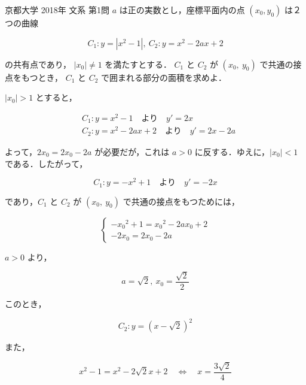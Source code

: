 \documentclass[a4paper]{ltjsarticle}
\begin{document}
\begin{itembox}[l]{京都大学 2018年 文系 第1問}
    $a$ は正の実数とし，座標平面内の点 $(x_0, y_0)$ は２つの曲線

    \begin{equation*}
        C_1\colon y=|x^2-1|,\ C_2\colon y=x^2-2ax+2
    \end{equation*}

    の共有点であり， $|x_0|\neq 1$ を満たすとする． $C_1$ と $C_2$ が $(x_0,\ y_0)$ で共通の接点をもつとき， $C_1$ と $C_2$ で囲まれる部分の面積を求めよ．
\end{itembox}

$|x_0|>1$ とすると，

\begin{align*}
     & C_1\colon y=x^2-1\quad\text{より}\quad y'=2x        \\
     & C_2\colon y=x^2-2ax+2\quad\text{より}\quad y'=2x-2a
\end{align*}

よって，$2x_0=2x_0-2a$ が必要だが，これは $a>0$ に反する．ゆえに，$|x_0|<1$ である．したがって，

\begin{equation*}
    C_1\colon y=-x^2+1\quad\text{より}\quad y'=-2x
\end{equation*}

であり，$C_1$ と $C_2$ が $(x_0,\ y_0)$ で共通の接点をもつためには，

\begin{equation*}
    \begin{cases}
        -{x_0}^2+1={x_0}^2-2ax_0+2 \\
        -2x_0=2x_0-2a
    \end{cases}
\end{equation*}

$a>0$ より，

\begin{equation*}
    a=\sqrt{2},\ x_0=\frac{\sqrt{2}}{2}
\end{equation*}

このとき，

\begin{equation*}
    C_2\colon y=(x-\sqrt{2})^2
\end{equation*}

また，

\begin{equation*}
    x^2-1=x^2-2\sqrt{2}x+2\quad\Longleftrightarrow\quad x=\frac{3\sqrt{2}}{4}
\end{equation*}
\end{document}
